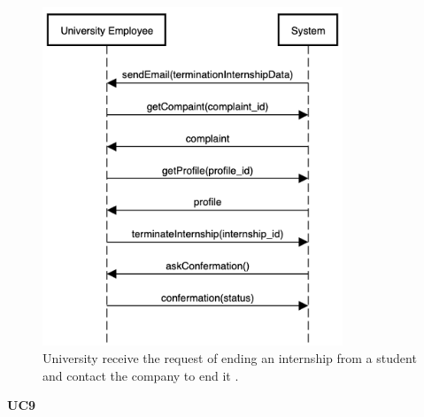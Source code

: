     \begin{figure}[H]
        \centering
        \includegraphics[width=0.8\textwidth]{RASD/Assets/SequenceDiagrams/8-student-end-internship.png}
        \caption{University receive the request of ending an internship from a student and contact the company to end it .}
        \label{fig:University receive the request of ending an internship from a student and contact the company to end it }
    \end{figure}


    \textbf{UC9}
    
